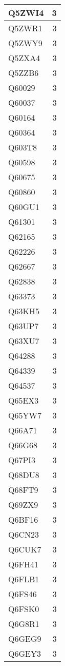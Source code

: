 \documentclass[
]{book}
\theoremstyle{definition}
\theoremstyle{definition}
\theoremstyle{definition}
\theoremstyle{definition}
\theoremstyle{remark}
\begin{document}
\begin{table}
\begin{tabular}{l|r}
\hline
Q5ZWI4 & 3\\
\hline
Q5ZWR1 & 3\\
\hline
Q5ZWY9 & 3\\
\hline
Q5ZXA4 & 3\\
\hline
Q5ZZB6 & 3\\
\hline
Q60029 & 3\\
\hline
Q60037 & 3\\
\hline
Q60164 & 3\\
\hline
Q60364 & 3\\
\hline
Q603T8 & 3\\
\hline
Q60598 & 3\\
\hline
Q60675 & 3\\
\hline
Q60860 & 3\\
\hline
Q60GU1 & 3\\
\hline
Q61301 & 3\\
\hline
Q62165 & 3\\
\hline
Q62226 & 3\\
\hline
Q62667 & 3\\
\hline
Q62838 & 3\\
\hline
Q63373 & 3\\
\hline
Q63KH5 & 3\\
\hline
Q63UP7 & 3\\
\hline
Q63XU7 & 3\\
\hline
Q64288 & 3\\
\hline
Q64339 & 3\\
\hline
Q64537 & 3\\
\hline
Q65EX3 & 3\\
\hline
Q65YW7 & 3\\
\hline
Q66A71 & 3\\
\hline
Q66G68 & 3\\
\hline
Q67PI3 & 3\\
\hline
Q68DU8 & 3\\
\hline
Q68FT9 & 3\\
\hline
Q69ZX9 & 3\\
\hline
Q6BF16 & 3\\
\hline
Q6CN23 & 3\\
\hline
Q6CUK7 & 3\\
\hline
Q6FH41 & 3\\
\hline
Q6FLB1 & 3\\
\hline
Q6FS46 & 3\\
\hline
Q6FSK0 & 3\\
\hline
Q6G8R1 & 3\\
\hline
Q6GEG9 & 3\\
\hline
Q6GEY3 & 3\\

\end{tabular}
\end{table}
\end{document}
